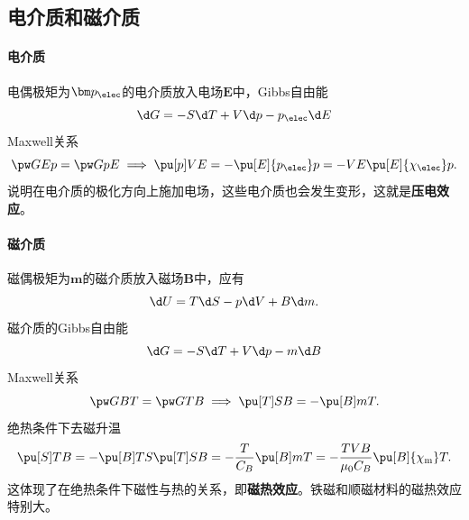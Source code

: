 \subsection{电介质和磁介质}

\paragraph{电介质}

电偶极矩为$\bm p_\elec$的电介质放入电场$\bm E$中，Gibbs自由能
\[
	\d G=-S\d T+V\d p-p_\elec\d E
\]
Maxwell关系
\begin{equation}
	\pw GEp=\pw GpE\implies
	\pu[p]VE=-\pu[E]{p_\elec}p=-VE\pu[E]{\chi_\elec}p.
\end{equation}
说明在电介质的极化方向上施加电场，这些电介质也会发生变形，这就是\textbf{压电效应}。

\paragraph{磁介质}

磁偶极矩为$\bm m$的磁介质放入磁场$\bm B$中，应有
\[
	\d U=T\d S-p\d V+B\d m.
\]
磁介质的Gibbs自由能
\[
	\d G=-S\d T+V\d p-m\d B
\]
Maxwell关系
\[
	\pw GBT=\pw GTB\implies
	\pu[T]SB=-\pu[B]mT.
\]
绝热条件下去磁升温
\[
	\pu[S]TB=-\pu[B]TS\pu[T]SB=-\frac T{C_B}\pu[B]mT=-\frac{TVB}{\mu_0C_B}\pu[B]{\chi_{\mathrm{m}}}T.
\]
这体现了在绝热条件下磁性与热的关系，即\textbf{磁热效应}。铁磁和顺磁材料的磁热效应特别大。

